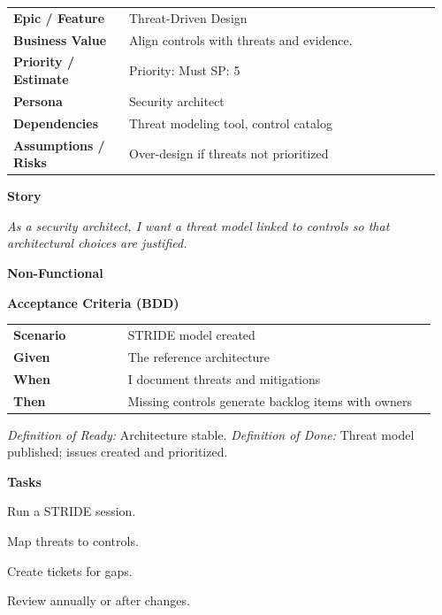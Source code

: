 \documentclass[11pt,letterpaper]{article}
\makeatletter
\newenvironment{kvtable}{%
  \par\noindent\begin{tabular}{@{}>{\raggedright\bfseries\arraybackslash}p{0.26\linewidth} >{\raggedright\arraybackslash}p{0.70\linewidth}@{}}
}{\end{tabular}\par}
\newenvironment{bdd}{%
  \par\noindent\begin{tabular}{@{}>{\raggedright\bfseries\arraybackslash}p{0.26\linewidth} >{\raggedright\arraybackslash}p{0.70\linewidth}@{}}
}{\end{tabular}\par}
\newcommand{\DoRDoD}[2]{%
  \vspace{0.35em}
  {\footnotesize\color{Muted}%
    \textit{Definition of Ready:} #1 \; \textbullet\;
    \textit{Definition of Done:} #2%
  }%
}
\newenvironment{storycard}[2]{%
  \begin{tcolorbox}[cloudcard, title={#1 --- #2}]%
}{\end{tcolorbox}}
\newcommand{\sectionlabel}[1]{\par\vspace{0.35em}\textbf{#1}\par}
\makeatother
\begin{document}
\begin{storycard}{CCS-16}{Ch. 16 — Secure Cloud Architecture}
\begin{kvtable}
Epic / Feature & Threat-Driven Design\\
Business Value & Align controls with threats and evidence.\\
Priority / Estimate & Priority: Must \quad SP: 5\\
Persona & Security architect\\
Dependencies & Threat modeling tool, control catalog\\
Assumptions / Risks & Over-design if threats not prioritized\\
\end{kvtable}
\sectionlabel{Story}
\textit{As a security architect, I want a threat model linked to controls so that architectural choices are justified.}
\sectionlabel{Non-Functional}\;
\sectionlabel{Acceptance Criteria (BDD)}
\begin{bdd}
Scenario & STRIDE model created\\
Given & The reference architecture\\
When & I document threats and mitigations\\
Then & Missing controls generate backlog items with owners\\
\end{bdd}
\DoRDoD{Architecture stable.}{Threat model published; issues created and prioritized.}
\sectionlabel{Tasks}
\begin{checklist}
\item Run a STRIDE session.
\item Map threats to controls.
\item Create tickets for gaps.
\item Review annually or after changes.
\end{checklist}
\end{storycard}
\end{document}
